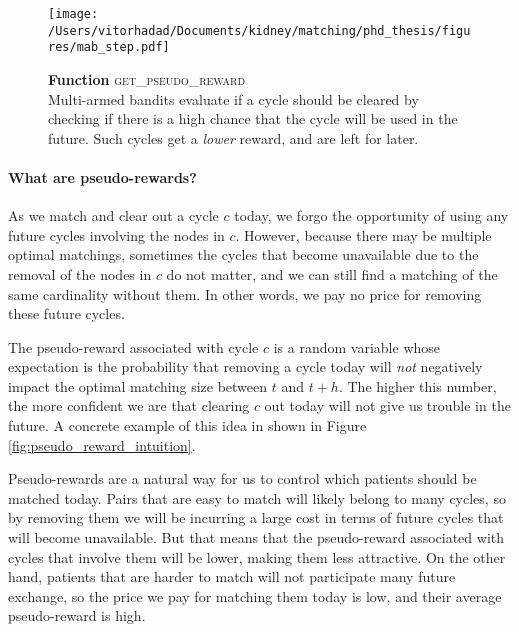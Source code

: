   \begin{figure}[htbp]
  \centering
  \texttt{[image: /Users/vitorhadad/Documents/kidney/matching/phd\_thesis/figures/mab\_step.pdf]}
  \caption[Function \textsc{get\_pseudo\_reward}]{\textbf{Function} \textsc{get\_pseudo\_reward} \\ Multi-armed bandits evaluate if a cycle should be cleared by checking if there is a high chance that the cycle will be used in the future. Such cycles get a \emph{lower} reward, and are left for later.}
  \label{fig:get_pseudo_reward}
  \end{figure}

\paragraph{What are pseudo-rewards?} As we match and clear out a cycle $c$ today, we forgo the opportunity of using any future cycles involving the nodes in $c$. However, because there may be multiple optimal matchings, sometimes the cycles that become unavailable due to the removal of the nodes in $c$ do not matter, and we can still find a matching of the same cardinality without them. In other words, we pay no price for removing these future cycles.
 
The pseudo-reward associated with cycle $c$ is a random variable whose expectation is the probability that removing a cycle today will \emph{not} negatively impact the optimal matching size between $t$ and $t+h$. The higher this number, the more confident we are that clearing $c$ out today will not give us trouble in the future. A concrete example of this idea in shown in Figure \ref{fig:pseudo_reward_intuition}.

Pseudo-rewards are a natural way for us to control which patients should be matched today. Pairs that are easy to match will likely belong to many cycles, so by removing them we will be incurring a large cost in terms of future cycles that will become unavailable. But that means that the pseudo-reward associated with cycles that involve them will be lower, making them less attractive. On the other hand, patients that are harder to match will not participate many future exchange, so the price we pay for matching them today is low, and their average pseudo-reward is high. 

